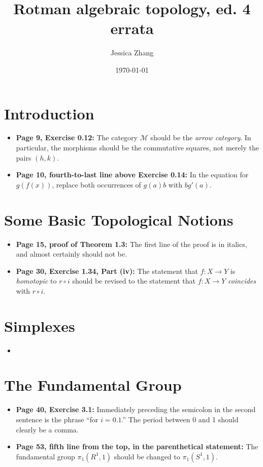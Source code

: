 \documentclass{article}
\title{Rotman algebraic topology, ed. 4 errata}
\author{Jessica Zhang}
\date{\today}
\newcommand*\loc[1]{\textbf{#1:}}
\begin{document}
\maketitle

\section{Introduction} 
\begin{itemize} 
\item \loc{Page 9, Exercise 0.12} 
The category $\mathcal M$ should be the \emph{arrow category}. In particular, the morphisms should be the commutative squares, not merely the pairs $(h,k)$. 

\item \loc{Page 10, fourth-to-last line above Exercise 0.14} 
In the equation for $g(f(x))$, replace both occurrences of $g(a)b$ with $bg'(a)$. 
\end{itemize} 

\section{Some Basic Topological Notions} 
\begin{itemize}
\item \loc{Page 15, proof of Theorem 1.3} 
The first line of the proof is in italics, and almost certainly should not be. 

\item \loc{Page 30, Exercise 1.34, Part (iv)} 
The statement that $f:X\to Y$ is \emph{homotopic} to $r\circ i$ should be revised to the statement that $f:X\to Y$ \emph{coincides} with $r\circ i$. 
\end{itemize}

\section{Simplexes} 
\begin{itemize}
\item 
\end{itemize} 

\section{The Fundamental Group} 
\begin{itemize}
\item \loc{Page 40, Exercise 3.1} 
Immediately preceding the semicolon in the second sentence is the phrase ``for $i=0.1$.'' The period between 0 and 1 should clearly be a comma.
\item \loc{Page 53, fifth line from the top, in the parenthetical statement} 
The fundamental group $\pi_1(R^1,1)$ should be changed to $\pi_1(S^1,1)$. 
\end{itemize} 
\end{document}

